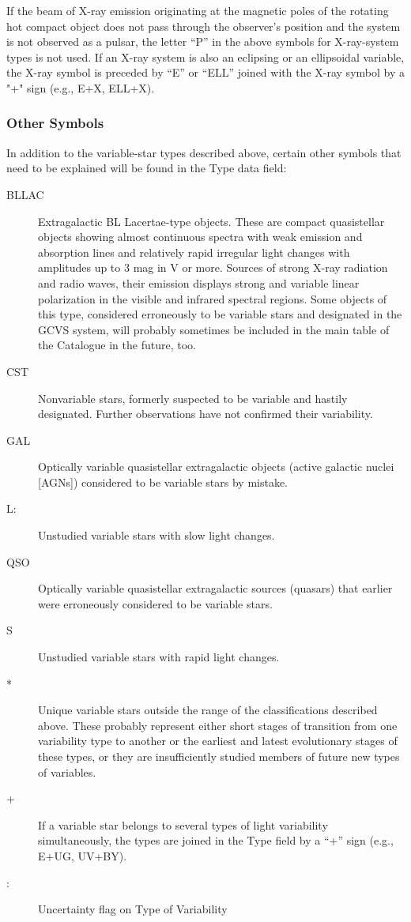 If the beam of X-ray emission originating at the magnetic poles of the
rotating hot compact object does not pass through the observer's
position and the system is not observed as a pulsar, the letter ``P'' in
the above symbols for X-ray-system types is not used. If an X-ray
system is also an eclipsing or an ellipsoidal variable, the X-ray symbol
is preceded by ``E'' or ``ELL'' joined with the X-ray symbol by a "+"
sign (e.g., E+X, ELL+X).

\subsubsection{Other Symbols}\label{other-symbols}

In addition to the variable-star types described above, certain other
symbols that need to be explained will be found in the Type data field:

\begin{description}
\item[BLLAC] Extragalactic BL Lacertae-type objects. These are
             compact quasistellar objects showing almost continuous spectra with weak
             emission and absorption lines and relatively rapid irregular light
             changes with amplitudes up to 3 mag in V or more. Sources of strong
             X-ray radiation and radio waves, their emission displays strong and
             variable linear polarization in the visible and infrared spectral
             regions. Some objects of this type, considered erroneously to be
             variable stars and designated in the GCVS system, will probably
             sometimes be included in the main table of the Catalogue in the future, too.
\item[CST]   Nonvariable stars, formerly suspected to be variable and
             hastily designated. Further observations have not confirmed their variability.
\item[GAL]   Optically variable quasistellar extragalactic objects
             (active galactic nuclei {[}AGNs{]}) considered to be variable stars by mistake.
\item[L:]    Unstudied variable stars with slow light changes.
\item[QSO]   Optically variable quasistellar extragalactic sources
             (quasars) that earlier were erroneously considered to be variable stars.
\item[S]     Unstudied variable stars with rapid light changes.
\item[*]     Unique variable stars outside the range of the
             classifications described above. These probably represent either short
             stages of transition from one variability type to another or the
             earliest and latest evolutionary stages of these types, or they are
             insufficiently studied members of future new types of variables.
\item[+]     If a variable star belongs to several types of light
             variability simultaneously, the types are joined in the Type field by a
             ``+'' sign (e.g., E+UG, UV+BY).
\item[:]     Uncertainty flag on Type of Variability
\end{description}

